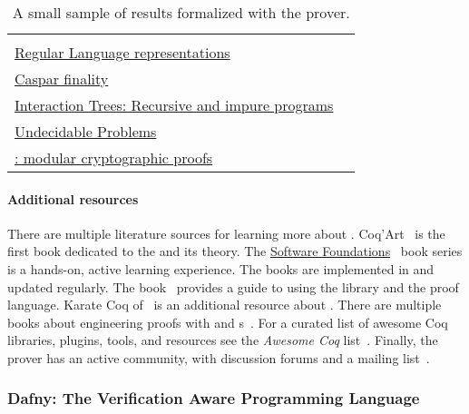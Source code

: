 \begin{table}[p]
\begin{NiceTabularX}{\textwidth}{@{}l@{ }X@{}}
   & \textcite{bauer2017}
   \\
   \href{https://github.com/rocq-community/reglang}%
   {Regular Language representations}
   & \textcite{doczkal2018}
   \\
   \href{https://github.com/runtimeverification/casper-proofs/tree/master}
   {Caspar  finality}
   & \textcite{palmskog2018}
   \\
   \href{https://github.com/DeepSpec/InteractionTrees}%
   {Interaction Trees: Recursive and impure programs}
   & \textcite{xia2019}
   \\
   \href{https://github.com/uds-psl/coq-library-undecidability}%
   {Undecidable Problems}
   & \textcite{forster2020b}
   \\
   \href{https://github.com/SSProve/ssprove}%
   {: modular cryptographic proofs}
   & \textcite{haselwarter2023}
   \\
   \bottomrule
\end{NiceTabularX}
\caption[The Rocq prover formalization results]
{A small sample of results formalized with the  prover.}
\label{tab:rocq-results}
\end{table}

\paragraph*{Additional resources}
There are multiple literature sources for learning more about .
Coq'Art~\cite{bertot2004} is the first book dedicated to the  and its theory. The
\href{https://softwarefoundations.cis.upenn.edu}{Software
Foundations}~\cite{cpierce20221} book series is a hands-on, active learning
experience. The books are implemented in  and updated regularly. The
 book~\cite{mahboubi2022} provides a guide to using
the library and the  proof language. Karate Coq
of~\textcite{affeldt2023} is an additional resource about . There are multiple books about engineering  proofs with
 and s~\cite{chlipala2022,chlipala2013,sergey2014,smolka2021}. For a curated
list of awesome Coq libraries, plugins, tools, and resources see the
\emph{Awesome Coq} list~\cite{awesome-coq}. Finally, the  prover has
an active community, with discussion forums and a mailing
list~\cite{rocq-community}.

\subsubsection{Dafny: The Verification Aware Programming Language}
\label{subsubsec:dafny}


